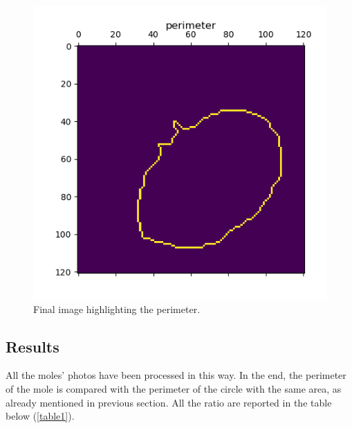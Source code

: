 \documentclass[a4paper,12pt,oneside,titlepage]{article}
\begin{document}
	\begin{figure}[H]
		\centering
		\includegraphics[scale=0.55]{low_risk_3_s_perimeter.png}
		
		\caption{Final image highlighting the perimeter.}
		\label{perimeter}
	\end{figure}
	
	
	\subsection{Results}
	All the moles' photos have been processed in this way. In the end, the perimeter of the mole is compared with the perimeter of the circle with the same area, as already mentioned in previous section. All the ratio are reported in the table below (\ref{table1}).
	
\end{document}
